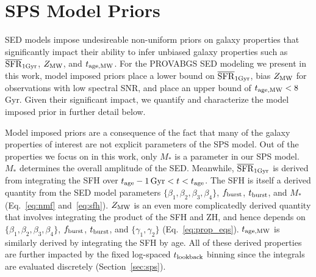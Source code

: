 \section{SPS Model Priors} \label{sec:model_priors}
SED models impose undesireable non-uniform priors on galaxy properties that
significantly impact their ability to infer unbiased galaxy properties such as
$\overline{\rm SFR}_{\rm 1Gyr}$, $Z_{\rm MW}$, and $t_{\rm age, MW}$. 
For the PROVABGS SED modeling we present in this work, model imposed priors
place a lower bound on $\overline{\rm SFR}_{\rm 1Gyr}$, bias $Z_{\rm MW}$ for observations with low
spectral SNR, and place an upper bound of $t_{\rm age, MW} < 8$ Gyr.
Given their significant impact, we quantify and characterize the model imposed
prior in further detail below. 

Model imposed priors are a consequence of the fact that many of the galaxy
properties of interest are not explicit parameters of the SPS model. 
Out of the properties we focus on in this work, only $M_*$ is a parameter in
our SPS model. 
$M_*$ determines the overall amplitude of the SED. 
Meanwhile, $\overline{\rm SFR}_{\rm 1Gyr}$ is derived from integrating the SFH over 
$t_{\rm age} - 1\,{\rm Gyr} < t < t_{\rm age}$.
The SFH is itself a derived quantity from the SED model parameters $\{\beta_1,
\beta_2, \beta_3, \beta_4 \}$, $f_{\rm burst}$, $t_{\rm burst}$, and $M_*$
(Eq.~\ref{eq:nmf} and~\ref{eq:sfh}).
$Z_{\rm MW}$ is an even more complicatedly derived quantity that involves integrating
the product of the SFH and ZH, and hence depends on $\{\beta_1, \beta_2,
\beta_3, \beta_4 \}$, $f_{\rm burst}$, $t_{\rm burst}$, and $\{\gamma_1,
\gamma_2\}$ (Eq.~\ref{eq:prop_eqs}).
$t_{\rm age, MW}$ is similarly derived by integrating the SFH by age. 
All of these derived properties are further impacted by the fixed log-spaced
$t_{\rm lookback}$ binning since the integrals are evaluated discretely
(Section~\ref{sec:sps}). 

